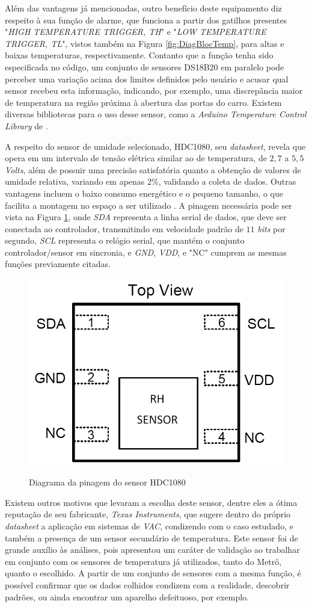 \documentclass[acronym,symbols,table]{fei}
\begin{document}
Além das vantagens já mencionadas, outro benefício deste equipamento diz respeito à sua função de alarme, que funciona a partir dos gatilhos presentes "\textit{HIGH TEMPERATURE TRIGGER, TH}" e "\textit{LOW TEMPERATURE TRIGGER, TL}", vistos também na Figura \ref{fig:DiagBlocTemp}, para altas e baixas temperaturas, respectivamente. Contanto que a função tenha sido especificada no código, um conjunto de sensores DS18B20 em paralelo pode perceber uma variação acima dos limites definidos pelo usuário e acusar qual sensor recebeu esta informação, indicando, por exemplo, uma discrepância maior de temperatura na região próxima à abertura das portas do carro. Existem diversas bibliotecas para o uso desse sensor, como a \textit{Arduino Temperature Control Library} de \textcite{Arduino-Temperature-Control-Library}.

A respeito do sensor de umidade selecionado, HDC1080, seu \textit{datasheet}, revela que opera em um intervalo de tensão elétrica similar ao de temperatura, de $2,7$ a $5,5$ \textit{Volts}, além de possuir uma precisão satisfatória quanto a obtenção de valores de umidade relativa, variando em apenas $2\%$, validando a coleta de dados. Outras vantagens incluem o baixo consumo energético e o pequeno tamanho, o que facilita a montagem no espaço a ser utilizado \cite{HDC1080}. A pinagem necessária pode ser vista na Figura \ref{fig:PinHum}, onde \textit{SDA} representa a linha serial de dados, que deve ser conectada ao controlador, transmitindo em velocidade padrão de $11$ \textit{bits} por segundo, \textit{SCL} representa o relógio serial, que mantém o conjunto controlador/sensor em sincronia, e \textit{GND}, \textit{VDD}, e "NC" cumprem as mesmas funções previamente citadas.

\begin{figure}[!htb]
\centering
    \caption{Diagrama da pinagem do sensor HDC1080}
    \includegraphics[width=0.4\linewidth]{Imagens/PinHum.png}
    \label{fig:PinHum}
\end{figure}

Existem outros motivos que levaram a escolha deste sensor, dentre eles a ótima reputação de seu fabricante, \textit{Texas Instruments}, que sugere dentro do próprio \textit{datasheet} a aplicação em sistemas de \textit{VAC}, condizendo com o caso estudado, e também a presença de um sensor secundário de temperatura. Este sensor foi de grande auxílio às análises, pois apresentou um caráter de validação ao trabalhar em conjunto com os sensores de temperatura já utilizados, tanto do Metrô, quanto o escolhido. A partir de um conjunto de sensores com a mesma função, é possível confirmar que os dados colhidos condizem com a realidade, descobrir padrões, ou ainda encontrar um aparelho defeituoso, por exemplo. 
\end{document}
